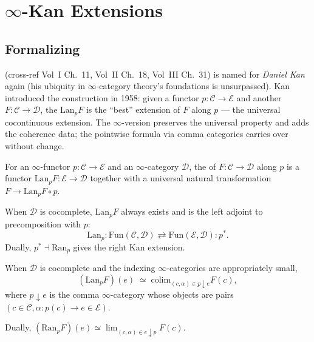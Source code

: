 \section{$\infty$-Kan Extensions}
\label{sec:infty-kan}

\subsection{Formalizing}

\begin{nameorigin}
 (cross-ref Vol~I Ch.~11, Vol~II Ch.~18, Vol~III
Ch.~31) is named for \emph{Daniel Kan} again (his ubiquity in
$\infty$-category theory's foundations is unsurpassed). Kan introduced
the construction in 1958: given a functor $p : \mathcal{C} \to
\mathcal{E}$ and another $F : \mathcal{C} \to \mathcal{D}$, the
 $\mathrm{Lan}_p F$ is the ``best''
extension of $F$ along $p$ — the universal cocontinuous extension. The
$\infty$-version preserves the universal property and adds the coherence
data; the pointwise formula via comma categories carries over without
change.
\end{nameorigin}

\begin{definition}
\label{def:infty-kan}
For an $\infty$-functor $p : \mathcal{C} \to \mathcal{E}$ and an
$\infty$-category $\mathcal{D}$, the 
of $F : \mathcal{C} \to \mathcal{D}$ along $p$ is a functor
$\mathrm{Lan}_p F : \mathcal{E} \to \mathcal{D}$ together with a
universal natural transformation $F \to \mathrm{Lan}_p F \circ p$.

When $\mathcal{D}$ is cocomplete, $\mathrm{Lan}_p F$ always exists and is
the left adjoint to precomposition with $p$:
\begin{equation*}
  \mathrm{Lan}_p : \mathrm{Fun}(\mathcal{C}, \mathcal{D}) \rightleftarrows
  \mathrm{Fun}(\mathcal{E}, \mathcal{D}) : p^*.
\end{equation*}
Dually, $p^* \dashv \mathrm{Ran}_p$ gives the right Kan extension.
\end{definition}

\begin{theorem}
\label{thm:pointwise-kan}
When $\mathcal{D}$ is cocomplete and the indexing $\infty$-categories
are appropriately small,
\begin{equation*}
  (\mathrm{Lan}_p F)(e) \;\simeq\; \mathrm{colim}_{(c, \alpha) \in p \downarrow e} F(c),
\end{equation*}
where $p \downarrow e$ is the comma $\infty$-category whose objects are
pairs $(c \in \mathcal{C}, \alpha : p(c) \to e \in \mathcal{E})$.

Dually, $(\mathrm{Ran}_p F)(e) \simeq \lim_{(c, \alpha) \in e \downarrow p} F(c)$.
\end{theorem}

